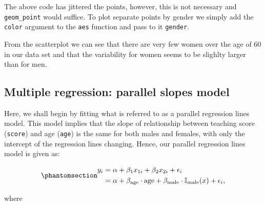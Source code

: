 \documentclass[
  letterpaper,
  DIV=11,
  numbers=noendperiod]{scrartcl}
\begin{document}
\begin{tcolorbox}[enhanced jigsaw, coltitle=black, bottomtitle=1mm, arc=.35mm, colframe=quarto-callout-note-color-frame, left=2mm, opacityback=0, colback=white, title=\textcolor{quarto-callout-note-color}{\faInfo}\hspace{0.5em}{Note}, toptitle=1mm, titlerule=0mm, breakable, rightrule=.15mm, bottomrule=.15mm, toprule=.15mm, colbacktitle=quarto-callout-note-color!10!white, leftrule=.75mm, opacitybacktitle=0.6]

The above code has jittered the points, however, this is not necessary
and \texttt{geom\_point} would suffice. To plot separate points by
gender we simply add the \texttt{color} argument to the \texttt{aes}
function and pass to it \texttt{gender}.

\end{tcolorbox}

From the scatterplot we can see that there are very few women over the
age of 60 in our data set and that the variability for women seems to be
slighlty larger than for men.

\subsection{Multiple regression: parallel slopes
model}\label{multiple-regression-parallel-slopes-model}

Here, we shall begin by fitting what is referred to as a parallel
regression lines model. This model implies that the slope of
relationship between teaching score (\texttt{score}) and age
(\texttt{age}) is the same for both males and females, with only the
intercept of the regression lines changing. Hence, our parallel
regression lines model is given as:

\begin{equation}\phantomsection\label{eq-parallel.lm}{
\begin{aligned}
y_{i} &= \alpha + \beta_1 x_{1i} + \beta_2 x_{2i} + \epsilon_i \nonumber \\&= \alpha + \beta_{\text{age}} \cdot \text{age} + \beta_{\text{male}} \cdot \mathbb{I}_{\text{male}}(x) + \epsilon_i, 
\end{aligned}
}\end{equation}

where
\end{document}
